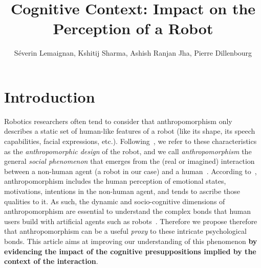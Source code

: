 \documentclass[lettersize, noapacite, twoside, HRI]{apa_HRI}
\title{Cognitive Context: Impact on the Perception of a Robot}
\author{S\'everin Lemaignan, Kshitij Sharma, Ashish Ranjan Jha, Pierre
Dillenbourg}
\affiliation{CHILI Lab, \'Ecole Polytechnique F\'ed\'erale de Lausanne}
\begin{document}
\maketitle

\section{Introduction}

Robotics researchers often tend to consider that anthropomorphism only describes
a static set of human-like features of a robot (like its shape, its speech
capabilities, facial expressions, etc.).
Following~\citet{fink_anthropomorphism_2012}, we refer to these characteristics
as the \emph{anthropomorphic design} of the robot, and we call
\emph{anthropomorphism} the general \emph{social phenomenon} that emerges from
the (real or imagined) interaction between a non-human agent (a robot in our
case) and a human~\citep{persson_anthropomorphism_2000}.  According
to~\citet{epley_when_2008}, anthropomorphism includes the human perception of
emotional states, motivations, intentions in the non-human agent, and tends to
ascribe those qualities to it. As such, the dynamic and socio-cognitive
dimensions of anthropomorphism are essential to understand the complex bonds
that human users build with artificial agents such as
robots~\citep{lemaignan2014dynamics}. Therefore we propose therefore that
anthropomorphism can be a useful \emph{proxy} to these intricate psychological
bonds. This article aims at improving our understanding of this phenomenon
\textbf{by evidencing the impact of the cognitive presuppositions implied by the
context of the interaction}.
\end{document}
